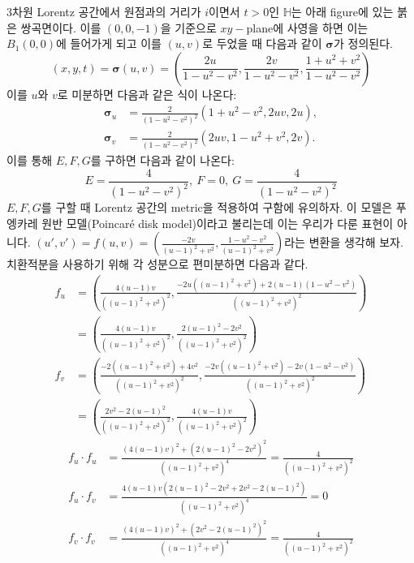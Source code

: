 \documentclass[10pt,a4paper]{article}
\newcounter{fig}
\begin{document}
3차원 Lorentz 공간에서 원점과의 거리가 $i$이면서 $t>0$인 $\mathbb{H}$는 아래 figure에 있는 붉은 쌍곡면이다. 이를 $(0,0,-1)$을 기준으로 $xy-$plane에 사영을 하면 이는 $B_1(0,0)$에 들어가게 되고 이를 $(u,v)$로 두었을 때 다음과 같이 $\boldsymbol{\sigma}$가 정의된다.%
\[
(x,y,t)=\boldsymbol{\sigma}(u,v)=\left( \frac{2u}{1-u^{2}-v^{2}}, \frac{2v}{1-u^{2}-v^{2}}, \frac{1+u^{2}+v^{2}}{1-u^{2}-v^{2}} \right)
\]
이를 $u$와 $v$로 미분하면 다음과 같은 식이 나온다:%
\begin{align*}
\boldsymbol{\sigma}_u &= \frac{2}{(1-u^{2}-v^{2})^{2}}(1+u^{2}-v^{2},2uv,2u),\\
\boldsymbol{\sigma}_v &= \frac{2}{(1-u^{2}-v^{2})^{2}}(2uv,1-u^{2}+v^{2},2v).
\end{align*}
이를 통해 $E,F,G$를 구하면 다음과 같이 나온다:\[
E=\frac{4}{(1-u^{2}-v^{2})^{2}},~F=0,~G=\frac{4}{(1-u^{2}-v^{2})^{2}}
\]
$E,F,G$를 구할 때 Lorentz 공간의 metric을 적용하여 구함에 유의하자. 이 모델은 푸엥카레 원반 모델(Poincaré disk model)이라고 불리는데 이는 우리가 다룬 표현이 아니다. $(u',v')=f(u,v)=\left(\frac{-2v}{(u-1)^2+v^2},\frac{1-u^2-v^2}{(u-1)^2+v^2}\right)$라는 변환을 생각해 보자. 치환적분을 사용하기 위해 각 성분으로 편미분하면 다음과 같다.
\begin{align*}
f_u&=\left(
\frac{4(u-1)v}{((u-1)^2+v^2)^2},
\frac{-2u((u-1)^2+v^2)+2(u-1)(1-u^2-v^2)}{((u-1)^2+v^2)^2}\right)\\
&=\left(
\frac{4(u-1)v}{((u-1)^2+v^2)^2},
\frac{2(u-1)^2-2v^2}{((u-1)^2+v^2)^2}\right)\\
f_v&=\left(
\frac{-2((u-1)^2+v^2)+4v^2}{((u-1)^2+v^2)^2},
\frac{-2v((u-1)^2+v^2)-2v(1-u^2-v^2)}{((u-1)^2+v^2)^2}\right)\\
&=\left(
\frac{2v^2-2(u-1)^2}{((u-1)^2+v^2)^2},
\frac{4(u-1)v}{((u-1)^2+v^2)^2}\right)
\end{align*}
\begin{align*}
f_u\cdot f_u&=\frac{(4(u-1)v)^2 + (2(u-1)^2-2v^2)^2}{((u-1)^2+v^2)^4}=\frac{4}{((u-1)^2+v^2)^2}\\
f_u\cdot f_v&=\frac{4(u-1)v(2(u-1)^2-2v^2+2v^2-2(u-1)^2)}{((u-1)^2+v^2)^4}=0\\
f_v\cdot f_v&=\frac{(4(u-1)v)^2 + (2v^2-2(u-1)^2)^2}{((u-1)^2+v^2)^4}=\frac{4}{((u-1)^2+v^2)^2}\\
\end{align*}
\end{document}
